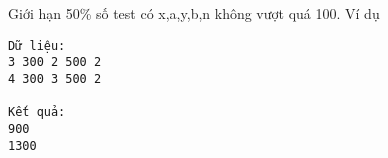 Giới hạn
50\% số test có x,a,y,b,n không vượt quá 100.
Ví dụ
\begin{verbatim}
Dữ liệu:
3 300 2 500 2
4 300 3 500 2

Kết quả:
900
1300

\end{verbatim}